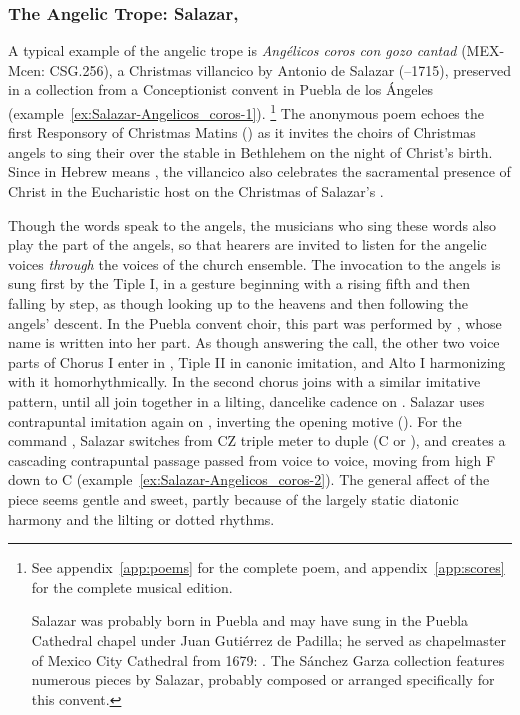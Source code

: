 \subsubsection{The Angelic Trope: Salazar, }

A typical example of the angelic trope is \emph{Angélicos coros con gozo cantad} (MEX-Mcen: CSG.256), a Christmas villancico by Antonio de Salazar (--1715), preserved in a collection from a Conceptionist convent in Puebla de los Ángeles (example~\ref{ex:Salazar-Angelicos_coros-1}).%
	\footnote{%
	See appendix~\ref{app:poems} for the complete poem, and appendix~\ref{app:scores} for the complete musical edition.
	
Salazar was probably born in Puebla and may have sung in the Puebla Cathedral chapel under Juan Gutiérrez de Padilla; he served as chapelmaster of Mexico City Cathedral from 1679: \autocite{Koegel:Salazar}. 
The Sánchez Garza collection features numerous pieces by Salazar, probably composed or arranged specifically for this convent.
	}
The anonymous poem echoes the first Responsory of Christmas Matins () as it invites the choirs of Christmas angels to sing their  over the stable in Bethlehem on the night of Christ's birth.
Since  in Hebrew means , the villancico also celebrates the sacramental presence of Christ in the Eucharistic host on the Christmas of Salazar's .

Though the words speak to the angels, the musicians who sing these words also play the part of the angels, so that hearers are invited to listen for the angelic voices \emph{through} the voices of the church ensemble. 
The invocation to the angels is sung first by the Tiple I, in a gesture beginning with a rising fifth and then falling by step, as though looking up to the heavens and then following the angels' descent.
In the Puebla convent choir, this part was performed by , whose name is written into her part.
As though answering the call, the other two voice parts of Chorus I enter in , Tiple II in canonic imitation, and Alto I harmonizing with it homorhythmically. 
In  the second chorus joins with a similar imitative pattern, until all join together in a lilting, dancelike cadence on .
Salazar uses contrapuntal imitation again on , inverting the opening motive ().
For the command  , Salazar switches from CZ triple meter to duple (C or ), and creates a cascading contrapuntal passage passed from voice to voice, moving from high F down to C (example~\ref{ex:Salazar-Angelicos_coros-2}).
The general affect of the piece seems gentle and sweet, partly because of the largely static diatonic harmony and the lilting or dotted rhythms.

